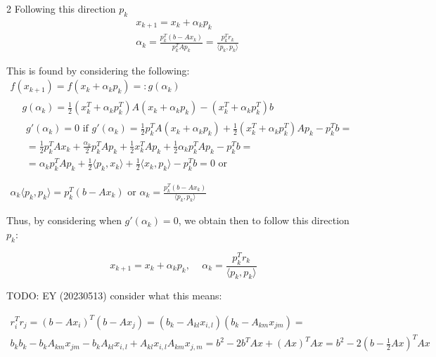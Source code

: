 \documentclass[10pt]{amsart}
\begin{document}
\begin{multicols*}{2}
Following this direction $p_k$
\begin{align}
& x_{k+1} = x_k + \alpha_k p_k \\ 
& \alpha_k = \frac{p_k^T (b-Ax_k) }{ p_k^T Ap_k } = \frac{p_k^T r_k }{\langle p_k, p_k \rangle}
\end{align}

This is found by considering the following:
\[
\begin{gathered}
f(x_{k+1}) = f(x_k + \alpha_k p_k) =: g(\alpha_k) \\
\begin{aligned}
& g(\alpha_k) = \frac{1}{2} ( x_k^T + \alpha_kp_k^T) A(x_k + \alpha_kp_k) - (x_k^T + \alpha_k p_k^T) b \\
& \begin{gathered}
g'(\alpha_k) =0 \text{ if } g'(\alpha_k) = \frac{1}{2} p_k^T A(x_k + \alpha_k p_k) + \frac{1}{2} (x_k^T + \alpha_k p_k^T) Ap_k - p_k^T b =  \\
= \frac{1}{2} p_k^T Ax_k + \frac{\alpha_k}{2} p_k^T A p_k + \frac{1}{2} x_k^T A p_k + \frac{1}{2} \alpha_k p_k^T A p_k - p_k^T b = \\
= \alpha_kp_k^T Ap_k + \frac{1}{2} \langle p_k, x_k \rangle + \frac{1}{2} \langle x_k , p_k \rangle - p_k^T b = 0 \text{ or } \\
\end{gathered}
\end{aligned} \\
\alpha_k \langle p_k , p_k \rangle = p_k^T (b-Ax_k) \text{ or } \alpha_k = \frac{ p_k^T(b-Ax_k) }{ \langle p_k , p_k \rangle }
\end{gathered}
\]

Thus, by considering when $g'(\alpha_k) =0$, we obtain then to follow this direction $p_k$:

\begin{equation}\label{Eq:ConjugateGradientMethodxIterativeStep}
x_{k+1} = x_k + \alpha_k p_k, \quad \, \alpha_k = \frac{ p_k^T r_k}{ \langle p_k , p_k \rangle }
\end{equation}

TODO: EY (20230513) consider what this means:

\[
\begin{gathered}
r_i^T r_j = (b-Ax_i)^T(b-Ax_j) = (b_k - A_{kl} x_{i,l} ) (b_k - A_{km} x_{jm} ) = \\
b_k b_k - b_k A_{km} x_{jm} - b_k A_{kl} x_{i,l} + A_{kl} x_{i,l} A_{km} x_{j,m} = b^2 - 2b^T A x + (Ax)^T Ax = b^2 - 2(b-\frac{1}{2} Ax)^T Ax
\end{gathered}
\]


\end{multicols*}
\end{document}
